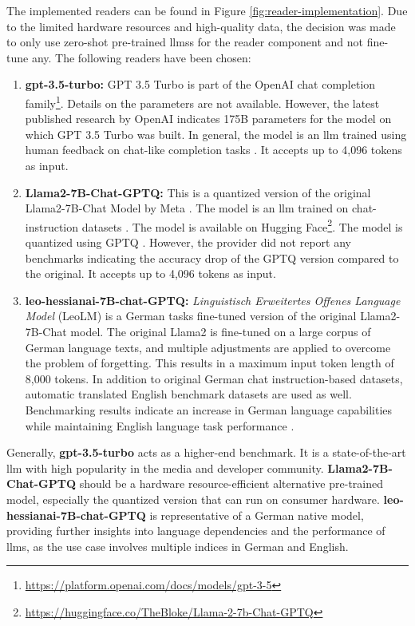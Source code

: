 The implemented readers can be found in Figure \ref{fig:reader-implementation}. Due to the limited hardware resources and high-quality data, the decision was made to only use zero-shot pre-trained \glspl{llm}s for the reader component and not fine-tune any. The following readers have been chosen:

\begin{enumerate}
    \item \textbf{gpt-3.5-turbo:} GPT 3.5 Turbo is part of the OpenAI chat completion family\footnote{\url{https://platform.openai.com/docs/models/gpt-3-5}}. Details on the parameters are not available. However, the latest published research by OpenAI indicates 175B parameters for the model on which GPT 3.5 Turbo was built. In general, the model is an \gls{llm} trained using human feedback on chat-like completion tasks \cite{ouyang_training_2022}. It accepts up to 4,096 tokens as input.
    \item \textbf{Llama2-7B-Chat-GPTQ:} This is a quantized version of the original Llama2-7B-Chat Model by Meta \cite{touvron_llama_2023}. The model is an \gls{llm} trained on chat-instruction datasets \cite{ouyang_training_2022}. The model is available on Hugging Face\footnote{\url{https://huggingface.co/TheBloke/Llama-2-7b-Chat-GPTQ}}. The model is quantized using GPTQ \cite{muennighoff_sgpt_2022}. However, the provider did not report any benchmarks indicating the accuracy drop of the GPTQ version compared to the original. It accepts up to 4,096 tokens as input.
    \item \textbf{leo-hessianai-7B-chat-GPTQ:} \textit{Linguistisch Erweitertes Offenes Language Model} (LeoLM) is a German tasks fine-tuned version of the original Llama2-7B-Chat model. The original Llama2 is fine-tuned on a large corpus of German language texts, and multiple adjustments are applied to overcome the problem of forgetting. This results in a maximum input token length of 8,000 tokens. In addition to original German chat instruction-based datasets, automatic translated English benchmark datasets are used as well. Benchmarking results indicate an increase in German language capabilities while maintaining English language task performance \cite{pluster_leolm_nodate}.
\end{enumerate}

Generally, \textbf{gpt-3.5-turbo} acts as a higher-end benchmark. It is a state-of-the-art \gls{llm} with high popularity in the media and developer community. \textbf{Llama2-7B-Chat-GPTQ} should be a hardware resource-efficient alternative pre-trained model, especially the quantized version that can run on consumer hardware. \textbf{leo-hessianai-7B-chat-GPTQ} is representative of a German native model, providing further insights into language dependencies and the performance of \gls{llm}s, as the use case involves multiple indices in German and English.

